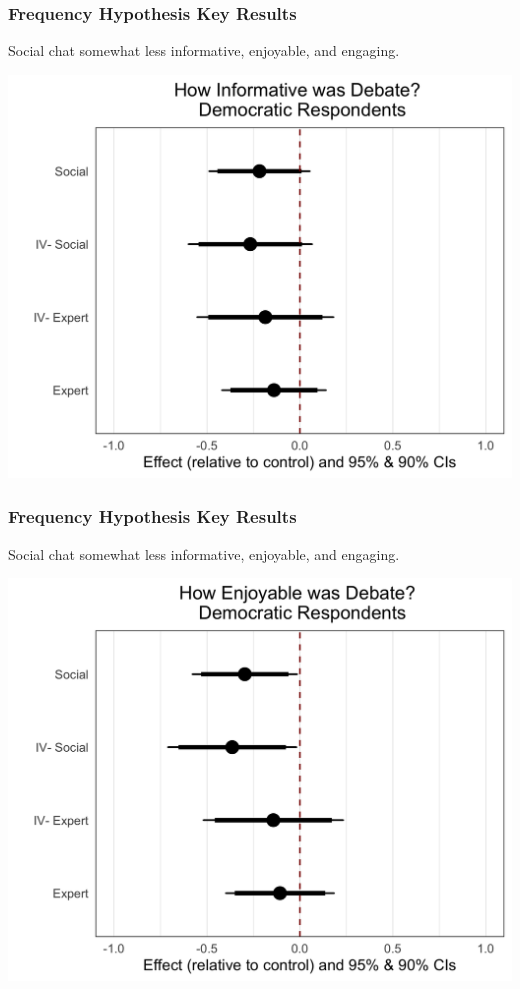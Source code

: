 \documentclass{beamer}
\begin{document}
\begin{frame}
\frametitle{Frequency Hypothesis Key Results}

Social chat somewhat less informative, enjoyable, and engaging.

\centering
	\includegraphics[width=.8\linewidth]{informative_dem.png}

\end{frame}

\begin{frame}
\frametitle{Frequency Hypothesis Key Results}

Social chat somewhat less informative, enjoyable, and engaging.

\centering
	\includegraphics[width=.8\linewidth]{enjoyment_dem.png}\\

\end{frame}
\end{document}
